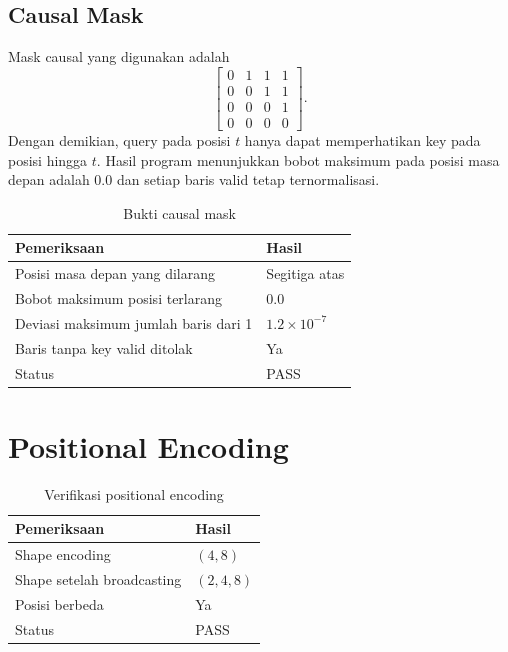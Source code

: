 \documentclass[12pt,a4paper]{article}
\begin{document}
\subsection{Causal Mask}
Mask causal yang digunakan adalah
\[
\begin{bmatrix}
0&1&1&1\\
0&0&1&1\\
0&0&0&1\\
0&0&0&0
\end{bmatrix}.
\]
Dengan demikian, query pada posisi $t$ hanya dapat memperhatikan key pada
posisi hingga $t$. Hasil program menunjukkan bobot maksimum pada posisi masa
depan adalah $0.0$ dan setiap baris valid tetap ternormalisasi.

\begin{table}[H]
    \centering
    \caption{Bukti causal mask}
    \label{tab:causal-mask}
    \begin{tabular}{l l}
        \toprule
        Pemeriksaan & Hasil \\
        \midrule
        Posisi masa depan yang dilarang & Segitiga atas \\
        Bobot maksimum posisi terlarang & 0.0 \\
        Deviasi maksimum jumlah baris dari 1 & $1.2\times10^{-7}$ \\
        Baris tanpa key valid ditolak & Ya \\
        Status & PASS \\
        \bottomrule
    \end{tabular}
\end{table}

\section{Positional Encoding}

\begin{table}[H]
    \centering
    \caption{Verifikasi positional encoding}
    \label{tab:positional-encoding}
    \begin{tabular}{l l}
        \toprule
        Pemeriksaan & Hasil \\
        \midrule
        Shape encoding & $(4,8)$ \\
        Shape setelah broadcasting & $(2,4,8)$ \\
        Posisi berbeda & Ya \\
        Status & PASS \\
        \bottomrule
    \end{tabular}
\end{table}
\end{document}
